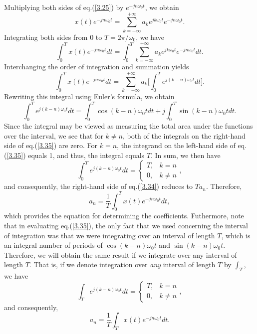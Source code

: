 \documentclass[a4paper,10pt,twoside]{book}
\begin{document}
Multiplying both sides of eq.\;(\ref{3.25}) by $e^{-jn\omega_0t}$, we obtain
\begin{equation}
    x(t)e^{-jn\omega_0t}=\sum_{k=-\infty}^{+\infty}a_ke^{jk\omega_0t}e^{-jn\omega_0t}.
    \label{3.33}
\end{equation}
Integrating both sides from 0 to $T=2\pi/\omega_0$, we have $$\int_0^Tx(t)e^{-jn\omega_0t} dt = \int_0^T\sum_{k=-\infty}^{+\infty}a_ke^{jk\omega_0t}e^{-jn\omega_0t} dt.$$ Interchanging the order of integration and summation yields
\begin{equation}
    \int_0^Tx(t)e^{-jn\omega_0t} dt = \sum_{k=-\infty}^{+\infty}a_k\bigg[\int_0^Te^{j(k-n)\omega_0t} dt\bigg].
    \label{3.34}
\end{equation}
Rewriting this integral using Euler's formula, we obtain
\begin{equation}
    \int_0^Te^{j(k-n)\omega_0t} dt = \int_0^T\cos(k-n)\omega_0t dt + j\int_0^T\sin(k-n)\omega_0t dt.
    \label{3.35}
\end{equation}
Since the integral may be viewed as measuring the total area under the functions over the interval, we see that for $k\ne n$, both of the integrals on the right-hand side of eq.\;(\ref{3.35}) are zero. For $k=n$, the integrand on the left-hand side of eq.\;(\ref{3.35}) equals 1, and thus, the integral equals $T$. In sum, we then have $$\left.\int_0^Te^{j(k-n)\omega_0t} dt=\left\{\begin{array}{ll}T,&k=n\\0,&k\neq n\end{array}\right.\right.,$$ and consequently, the right-hand side of eq.\;(\ref{3.34}) reduces to $Ta_n$. Therefore,
\begin{equation}
    a_n=\frac{1}{T}\int_0^Tx(t)e^{-jn\omega_0t} dt,
    \label{3.36}
\end{equation}
which provides the equation for determining the coefficients. Futhermore, note that in evaluating eq.\;(\ref{3.35}), the only fact that we used concerning the interval of integration was that we were integrating over an interval of length $T$, which is an integral number of periods of $\cos(k-n)\omega_0t$ and $\sin(k-n)\omega_0t$. Therefore, we will obtain the same result if we integrate over any interval of length $T$. That is, if we denote integration over \textit{any} interval of length $T$ by $\int_T$, we have $$\left.\int_Te^{j(k-n)\omega_0t} dt=\left\{\begin{array}{ll}T,&k=n\\0,&k\neq n\end{array}\right.\right.,$$ and consequently,
\begin{equation}
    a_n = \frac1T\int_Tx(t)e^{-jn\omega_0t} dt.
    \label{3.37}
\end{equation}
\end{document}
